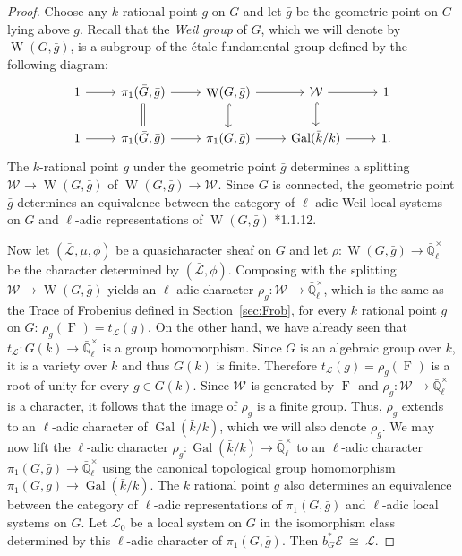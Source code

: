 \documentclass{amsart}
\theoremstyle{plain}
\theoremstyle{definition}
\theoremstyle{remark}
\newcommand{\EE}{\mathbb{\bar Q}_\ell}
\newcommand{\bFq}{\bar{k}}
\newcommand{\Fq}{k}
\newcommand{\EEx}{\EE^\times}
\newcommand{\Weil}[1]{\mathcal{W}_{#1}}
\DeclareMathOperator{\Gal}{Gal}
\DeclareMathOperator{\W}{W}
\newcommand{\Frob}[1]{\operatorname{F}_{#1}}
\newcommand{\iso}{{\ \cong\ }}
\newcommand{\qcs}[1]{{\mathcal{#1}}}
\newcommand{\gqcs}[1]{{\mathcal{\bar #1}}}
\newcommand{\trFrob}[1]{t_{#1}}
\newcommand{\bg}{\bar{g}}
\newcommand{\bG}{\bar{G}}
\begin{document}
\begin{proof}
Choose any $\Fq$-rational point $g$ on $G$ and let $\bg$ be the geometric point on $G$ lying above $g$.
Recall that the \emph{Weil group} of $G$, which we will denote by $\W(G,\bg)$, is a subgroup of the \'etale
fundamental group defined by the following diagram:
\[
 \begin{tikzcd}
 1 \rar & \ar[equal]{d} \pi_1(\bG, \bg) \rar & \W(G,\bg) \rar \dar[hook] & \Weil{} \rar \dar[hook] & 1 \\
 1 \rar &  \pi_1(\bG, \bg) \rar & \pi_1(G,\bg) \rar & \Gal(\bFq/\Fq) \rar & 1.
 \end{tikzcd}
\]
The $\Fq$-rational point $g$ under the geometric point $\bg$ determines a splitting
$\Weil{}\to \W(G,\bg)$ of $\W(G,\bg)\to \Weil{}$.
%
  Since $G$ is connected, the geometric point $\bg$ determines
  an equivalence between the category of $\ell$-adic Weil local systems on $G$ and
  $\ell$-adic representations of $\W(G,\bg)$ \cite{deligne:80a}*{1.1.12}.
  
  Now let $(\gqcs{L},\mu,\phi)$ be a quasicharacter sheaf on $G$
  and let $\rho : \W(G, \bg) \to \EEx$ be the character determined by $(\gqcs{L},\phi)$.
  Composing with the splitting $\Weil{} \to \W(G,\bg)$ yields an $\ell$-adic character
  $\rho_g : \Weil{} \to \EEx$, which is the same as the Trace of Frobenius defined in Section~\ref{sec:Frob}, for every $\Fq$ rational point $g$ on $G$:
  $
  \rho_g(\Frob{}) =  \trFrob{\qcs{L}}(g).
  $
%
  On the other hand, we have already seen that $\trFrob{\qcs{L}} : G(\Fq) \to \EEx$
  is a group homomorphism. Since $G$ is an algebraic group over $\Fq$, it is a
  variety over $\Fq$ and thus $G(\Fq)$ is finite.
  Therefore $\trFrob{\qcs{L}}(g) = \rho_g(\Frob{})$ is a root of unity
  for every $g\in G(\Fq)$.  Since $\Weil{}$ is generated by
  $\Frob{}$ and $\rho_g : \Weil{} \to \EEx$ is
  a character, it follows that the image of $\rho_g$ is a finite group.
  Thus, $\rho_g$ extends to an $\ell$-adic character of $\Gal(\bFq/\Fq)$,
  which we will also denote $\rho_g$.
%
  We may now lift the $\ell$-adic character $\rho_g : \Gal(\bFq/\Fq) \to \EEx$
  to an $\ell$-adic character $\pi_1(G,\bg) \to \EEx$ using the canonical topological group homomorphism
  $\pi_1(G,\bg) \to \Gal(\bFq/\Fq)$. 
  The $\Fq$ rational point $g$ also
  determines an equivalence between the category of $\ell$-adic
  representations of $\pi_1(G,\bg)$ and $\ell$-adic local systems on $G$. Let
  $\qcs{L}_0$ be a local system on $G$ in the isomorphism class
  determined by this $\ell$-adic character of $\pi_1(G,\bg)$.
  Then $b_G^*\qcs{E} \iso \gqcs{L}$.
  

\end{proof}
\end{document}
